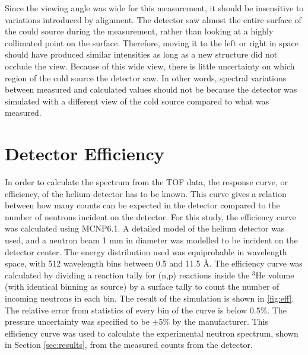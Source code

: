 \documentclass[5p,12pt]{elsarticle}
\begin{document}
Since the viewing angle was wide for this measurement, it should be insensitive to variations introduced by alignment.  The detector saw almost the entire surface of the could source during the measurement, rather than looking at a highly collimated point on the surface. Therefore, moving it to the left or right in space should have produced similar intensities as long as a new structure did not occlude the view.  Because of this wide view, there is little uncertainty on which region of the cold source the detector saw.   In other words, spectral variations between measured and calculated values should not be because the detector was simulated with a different view of the cold source compared to what was measured.

%
%
%
%
%

%
%
%
%
%


\section{Detector Efficiency}
\label{sec:eff}

In order to calculate the spectrum from the TOF data, the response curve, or efficiency, of the helium detector has to be known.  This curve gives a relation between how many counts can be expected in the detector compared to the number of neutrons incident on the detector.  For this study, the efficiency curve was calculated using MCNP6.1.  A detailed model of the helium detector was used, and a neutron beam 1 mm in diameter was modelled to be incident on the detector center.  The energy distribution used was equiprobable in wavelength space, with 512 wavelength bins between 0.5 and 11.5 {\AA}.  The efficiency curve was calculated by dividing a reaction tally for (n,p) reactions inside the $^3$He volume (with identical binning as source) by a surface tally to count the number of incoming neutrons in each bin.  The result of the simulation is shown in \ref{fig:eff}.  The relative error from statistics of every bin of the curve is below 0.5\%.  The pressure uncertainty was specified to be $\pm$5\% by the manufacturer.  This efficiency curve was used to calculate the experimental neutron spectrum, shown in Section \ref{sec:results}, from the measured counts from the detector.
\end{document}
